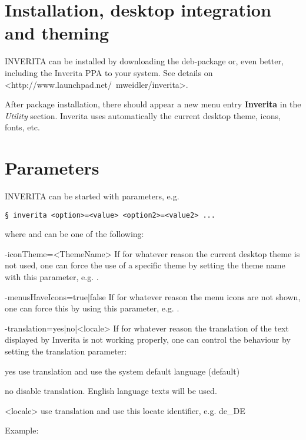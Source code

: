 \section{Installation, desktop integration and theming}
INVERITA can be installed by downloading the deb-package or, even better,
including the Inverita PPA to your system. See details on <http://www.launchpad.net/~mweidler/inverita>.

After package installation, there should appear a new menu entry \textbf{Inverita} in the
\textit{Utility} section. Inverita uses automatically the current desktop theme, icons,
fonts, etc.

\section{Parameters}
INVERITA can be started with parameters, e.g.

\begin{lstlisting}[style=console]
§ inverita <option>=<value> <option2>=<value2> ...
\end{lstlisting}

where  and  can be one of the following:
\begin{attributes}
 \item[-iconTheme=<ThemeName>]
    If for whatever reason the current desktop theme is not used, one can force the
    use of a specific theme by setting the theme name with this parameter, e.g.
    .

  \item[-menusHaveIcons=true|false]
    If for whatever reason the menu icons are not shown, one can force this by using
    this parameter, e.g. .

  \item[-translation=yes|no|<locale>]
    If for whatever reason the translation of the text displayed by Inverita is not
    working properly, one can control the behaviour by setting the translation
    parameter:
    \begin{attributes}[50pt]
       \item[yes]    use translation and use the system default language (default)
       \item[no]     disable translation. English language texts will be used.
       \item[<locale>] use translation and use this locate identifier, e.g. de\_DE
    \end{attributes}
    Example: 
\end{attributes}


